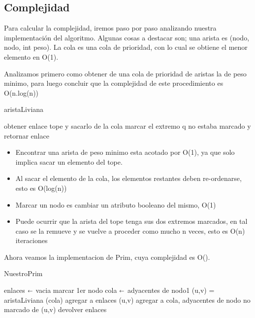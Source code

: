 \subsection{Complejidad}

Para calcular la complejidad, iremos paso por paso analizando nuestra implementación del algoritmo. Algunas cosas a destacar son; una arista es (nodo, nodo, int peso). La cola es una cola de prioridad, con lo cual se obtiene el menor elemento en O(1).


Analizamos primero como obtener de una cola de prioridad de aristas la de peso minimo, para luego concluir que la complejidad de este procedimiento es O(n.log(n))

\begin{algorithm}[H]
\caption{aristaLiviana}\label{ej2}
\begin{algorithmic}[1]
		\State obtener enlace tope y sacarlo de la cola 
			\State marcar el extremo q no estaba marcado y retornar enlace
		\EndIf
	\EndWhile
\EndProcedure
\end{algorithmic}
\end{algorithm}


\begin{itemize}
\item Encontrar una arista de peso minimo esta acotado por O(1), ya que solo implica sacar un elemento del tope.
\item Al sacar el elemento de la cola, los elementos restantes deben re-ordenarse, esto es O(log(n))
\item Marcar un nodo es cambiar un atributo booleano del mismo, O(1)
\item Puede ocurrir que la arista del tope tenga sus dos extremos marcados, en tal caso se la remueve y se vuelve a proceder como mucho n veces, esto es O(n) iteraciones
\end{itemize}  


Ahora veamos la implementacion de Prim, cuya complejidad es O().

\begin{algorithm}[H]
\caption{NuestroPrim}\label{ej2}
\begin{algorithmic}[1]
	\State enlaces $\shortleftarrow$ vacia 
	\State marcar 1er nodo
	\State cola $\shortleftarrow$ adyacentes de nodo1
		\State (u,v) = aristaLiviana (cola)
		\State agregar a enlaces (u,v)
		\State agregar a cola, adyacentes de nodo no marcado de (u,v)
	\EndWhile
	\State devolver enlaces
\EndProcedure
\end{algorithmic}
\end{algorithm}


